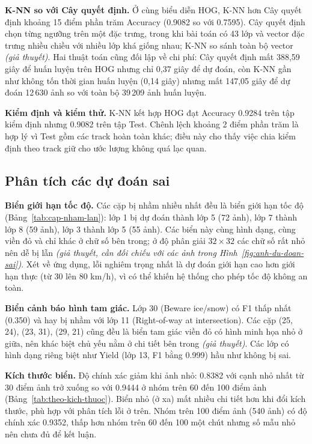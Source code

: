 \textbf{K-NN so với Cây quyết định.} Ở cùng biểu diễn HOG, K-NN hơn Cây quyết định khoảng 15 điểm phần trăm Accuracy (0.9082 so với 0.7595). Cây quyết định chọn từng ngưỡng trên một đặc trưng, trong khi bài toán có 43 lớp và vector đặc trưng nhiều chiều với nhiều lớp khá giống nhau; K-NN so sánh toàn bộ vector \textit{(giả thuyết)}. Hai thuật toán cũng đối lập về chi phí: Cây quyết định mất 388,59 giây để huấn luyện trên HOG nhưng chỉ 0,37 giây để dự đoán, còn K-NN gần như không tốn thời gian huấn luyện (0,14 giây) nhưng mất 147,05 giây để dự đoán 12\,630 ảnh so với toàn bộ 39\,209 ảnh huấn luyện.

\textbf{Kiểm định và kiểm thử.} K-NN kết hợp HOG đạt Accuracy 0.9284 trên tập kiểm định nhưng 0.9082 trên tập Test. Chênh lệch khoảng 2 điểm phần trăm là hợp lý vì Test gồm các track hoàn toàn khác; điều này cho thấy việc chia kiểm định theo track giữ cho ước lượng không quá lạc quan.

\subsection{Phân tích các dự đoán sai}

\textbf{Biển giới hạn tốc độ.} Các cặp bị nhầm nhiều nhất đều là biển giới hạn tốc độ (Bảng~\ref{tab:cap-nham-lan}): lớp 1 bị dự đoán thành lớp 5 (72 ảnh), lớp 7 thành lớp 8 (59 ảnh), lớp 3 thành lớp 5 (55 ảnh). Các biển này cùng hình dạng, cùng viền đỏ và chỉ khác ở chữ số bên trong; ở độ phân giải $32\times32$ các chữ số rất nhỏ nên dễ bị lẫn \textit{(giả thuyết, cần đối chiếu với các ảnh trong Hình~\ref{fig:anh-du-doan-sai})}. Xét về ứng dụng, lỗi nghiêm trọng nhất là dự đoán giới hạn cao hơn giới hạn thực (từ 30 lên 80 km/h), vì có thể khiến hệ thống cho phép tốc độ không an toàn.

\textbf{Biển cảnh báo hình tam giác.} Lớp 30 (Beware ice/snow) có F1 thấp nhất (0.350) và hay bị nhầm với lớp 11 (Right-of-way at intersection). Các cặp (25, 24), (23, 31), (29, 21) cũng đều là biển tam giác viền đỏ có hình minh họa nhỏ ở giữa, nên khác biệt chủ yếu nằm ở chi tiết bên trong \textit{(giả thuyết)}. Các lớp có hình dạng riêng biệt như Yield (lớp 13, F1 bằng 0.999) hầu như không bị sai.

\textbf{Kích thước biển.} Độ chính xác giảm khi ảnh nhỏ: 0.8382 với cạnh nhỏ nhất từ 30 điểm ảnh trở xuống so với 0.9444 ở nhóm trên 60 đến 100 điểm ảnh (Bảng~\ref{tab:theo-kich-thuoc}). Biển nhỏ (ở xa) mất nhiều chi tiết hơn khi đổi kích thước, phù hợp với phân tích lỗi ở trên. Nhóm trên 100 điểm ảnh (540 ảnh) có độ chính xác 0.9352, thấp hơn nhóm trên 60 đến 100 một chút nhưng số mẫu nhỏ nên chưa đủ để kết luận.

